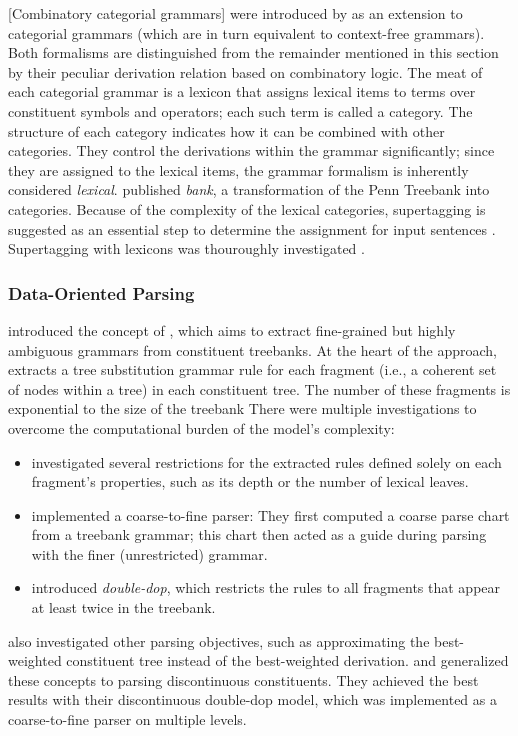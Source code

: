 \documentclass[../document.tex]{subfiles}
\begin{document}
    [Combinatory categorial grammars]  were introduced by \citet{Ste11} as an extension to categorial grammars (which are in turn equivalent to context-free grammars).
    Both formalisms are distinguished from the remainder mentioned in this section by their peculiar derivation relation based on combinatory logic.
    The meat of each categorial grammar is a lexicon that assigns lexical items to terms over constituent symbols and operators; each such term is called a category.
    The structure of each category indicates how it can be combined with other categories.
    They control the derivations within the grammar significantly; since they are assigned to the lexical items, the grammar formalism is inherently considered \emph{lexical}.
     published \emph{ bank}, a transformation of the Penn Treebank into  categories.
    Because of the complexity of the lexical categories, supertagging is suggested as an essential step to determine the assignment for input sentences \citep{Clark04}.
    Supertagging with  lexicons was thouroughly investigated \citep{clark2002supertagging, LewisSteedman14, vaswani2016supertagging, Kad18, StaSte20}.

    \subsubsection*{Data-Oriented Parsing}
     introduced the concept of  , which aims to extract fine-grained but highly ambiguous grammars from constituent treebanks.
    At the heart of the approach, \citeauthor{Bod92} extracts a tree substitution grammar rule for each fragment (i.e.\@, a coherent set of nodes within a tree) in each constituent tree.
    The number of these fragments is exponential to the size of the treebank
    There were multiple investigations to overcome the computational burden of the model's complexity:
    \begin{itemize}
        \item \citet{Bod01} investigated several restrictions for the extracted rules defined solely on each fragment's properties, such as its depth or the number of lexical leaves.
        \item \citet{Ban10} implemented a coarse-to-fine parser:
            They first computed a coarse parse chart from a treebank grammar; this chart then acted as a guide during parsing with the finer (unrestricted)  grammar.
        \item \citet{San11} introduced \emph{double-dop}, which restricts the rules to all fragments that appear at least twice in the treebank.
    \end{itemize}
     also investigated other parsing objectives, such as approximating the best-weighted constituent tree instead of the best-weighted derivation.
     and \cite{CraSchBod16} generalized these concepts to parsing discontinuous constituents.
    They achieved the best results with their discontinuous double-dop model, which was implemented as a coarse-to-fine parser on multiple levels.
\end{document}
